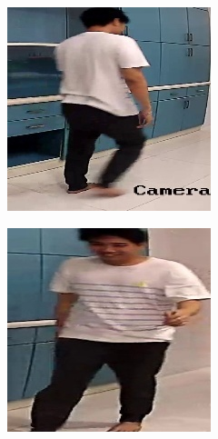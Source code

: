 \begin{figure}[!ht]
\begin{subfigure}[b]{0.45\linewidth}
    \end{subfigure}
   \begin{subfigure}[b]{0.45\linewidth}
      \includegraphics[width=\linewidth]{appendix/walk/000_CXS0_D0_000187.jpg}
    \end{subfigure}
    \begin{subfigure}[b]{0.45\linewidth}
      \includegraphics[width=\linewidth]{appendix/walk/000_CXS0_D0_000542.jpg}

\end{subfigure}
\end{figure}
